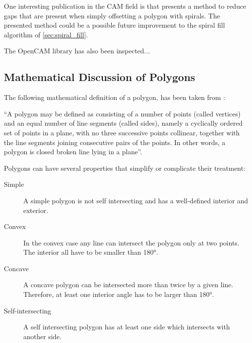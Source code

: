 One interesting publication in the CAM field is \cite{kao1998optimal} that presents a method to reduce gaps that are present when simply offsetting a polygon with spirals. The presented method could be a possible future improvement to the spiral fill algorithm of \autoref{sec:spiral_fill}.

The OpenCAM library has also been inspected...

\subsection{Mathematical Discussion of Polygons}

The following mathematical definition of a polygon, has been taken from \cite{coxeter1967geometry}:

\enquote{A polygon may be defined as consisting of a number of points (called vertices) and an equal number of line segments (called sides), namely a cyclically ordered set of points in a plane, with no three successive points collinear, together with the line segments joining consecutive pairs of the points. In other words, a polygon is closed broken line lying in a plane}.

Polygons can have several properties that simplify or complicate their treatment:

\begin{description}
\item[Simple] A simple polygon is not self intersecting and has a well-defined interior and exterior.\cite{weisstein_simple_p}
\item[Convex] In the convex case any line can intersect the polygon only at two points. The interior all have to be smaller than 180°.\cite{weisstein_convex_p}
\item[Concave] A concave polygon can be intersected more than twice by a given line. Therefore, at least one interior angle has to be larger than 180°.\cite{weisstein_concave_p}
\item[Self-intersecting] A self intersecting polygon has at least one side which intersects with another side.
\end{description}

